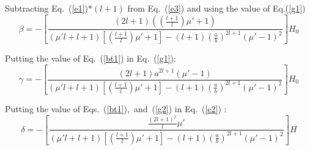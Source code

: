 Subtracting Eq.~(\ref{e1})$*(l+1)$ from Eq.~(\ref{e3}) and using the value of Eq.(\ref{g1})
\begin{equation}\label{bt1}
\beta=-\left[\frac{(2l+1)\left(\left(\frac{l+1}{l}\right)\mu'+1\right)}{(\mu'l+l+1)\left[\left(\frac{l+1}{l}\right)\mu'+1\right]-(l+1)\left(\frac{a}{b}\right)^{2l+1}(\mu'-1)^2}\right]H_0
\end{equation}



Putting the value of Eq.~(\ref{bt1}) in Eq.~(\ref{g1}):
\begin{equation}\label{g2}
\gamma=-\left[\frac{(2l+1)a^{2l+1}(\mu'-1)}{(\mu'l+l+1)\left[\left(\frac{l+1}{l}\right)\mu'+1\right]-(l+1)\left(\frac{a}{b}\right)^{2l+1}(\mu'-1)^2}\right] H_0    
\end{equation}

Putting the value of Eqs.~(\ref{bt1}),~and~(\ref{g2}) in Eq.~(\ref{e2}) :
\begin{equation}\label{dt1}
\delta =-\left[\frac{\frac{(2l+1)^2}{l}\mu'}{(\mu'l+l+1)\left[\left(\frac{l+1}{l}\right)\mu'+1\right]-(l+1)\left(\frac{a}{b}\right)^{2l+1}(\mu'-1)^2}\right]H    
\end{equation}


